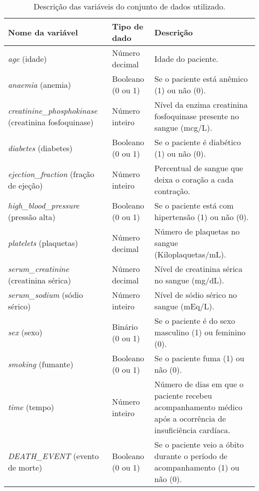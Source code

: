 \begin{table}[ht!]
  \begin{center}
  \setlength{\belowcaptionskip}{10pt}
  \footnotesize {
    \begin{tabular}{|p{4cm}|p{2.5cm}|p{8.5cm}|}
	  \hline
	  \textbf{Nome da variável} & \textbf{Tipo de dado} & \textbf{Descrição} \\
	  \hline
    \textit{age} (idade) & Número decimal & Idade do paciente. \\
    \hline
    \textit{anaemia} (anemia) & Booleano (0 ou 1) & Se o paciente está anêmico (1) ou não (0). \\
    \hline
    \textit{creatinine\_phosphokinase} \newline (creatinina fosfoquinase) & Número inteiro & Nível da enzima creatinina fosfoquinase presente no sangue (mcg/L). \\
    \hline
    \textit{diabetes} (diabetes) & Booleano (0 ou 1) & Se o paciente é diabético (1) ou não (0). \\
    \hline
    \textit{ejection\_fraction} \newline (fração de ejeção) & Número inteiro & Percentual de sangue que deixa o coração a cada contração. \\
    \hline
    \textit{high\_blood\_pressure} \newline (pressão alta) & Booleano (0 ou 1) & Se o paciente está com hipertensão (1) ou não (0). \\
    \hline
    \textit{platelets} (plaquetas) & Número decimal & Número de plaquetas no sangue (Kiloplaquetas/mL). \\
    \hline
    \textit{serum\_creatinine} \newline (creatinina sérica) & Número decimal & Nível de creatinina sérica no sangue (mg/dL). \\
    \hline
    \textit{serum\_sodium} \newline (sódio sérico) & Número inteiro & Nível de sódio sérico no sangue (mEq/L). \\
    \hline
    \textit{sex} (sexo) & Binário (0 ou 1) & Se o paciente é do sexo masculino (1) ou feminino (0). \\
    \hline
    \textit{smoking} (fumante) & Booleano (0 ou 1) & Se o paciente fuma (1) ou não (0). \\
    \hline
    \textit{time} (tempo) & Número inteiro & Número de dias em que o paciente recebeu acompanhamento médico após a ocorrência de insuficiência cardíaca. \\
    \hline
    \textit{DEATH\_EVENT} \newline (evento de morte) & Booleano (0 ou 1) & Se o paciente veio a óbito durante o período de acompanhamento (1) ou não (0). \\
    \hline
    \end{tabular}
  }
  \caption{Descrição das variáveis do conjunto de dados utilizado.}
  \label{table:descricao_conjunto_de_dados}
  \end{center}
\end{table}


